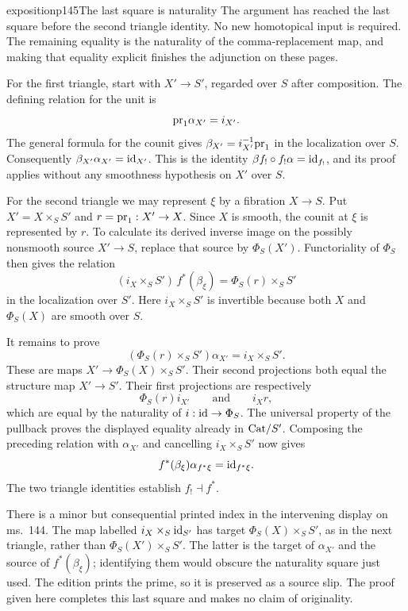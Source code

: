 \begin{dcomment}{exposition}{p145}{The last square is naturality}
The argument has reached the last square before the second triangle identity. No new homotopical input is required. The remaining equality is the naturality of the comma-replacement map, and making that equality explicit finishes the adjunction on these pages.

For the first triangle, start with $X'\to S'$, regarded over $S$ after composition. The defining relation for the unit is
\[
 \mathrm{pr}_1\alpha_{X'}=i_{X'}.
\]
The general formula for the counit gives $\beta_{X'}=i_{X'}^{-1}\mathrm{pr}_1$ in the localization over $S$. Consequently $\beta_{X'}\alpha_{X'}=\mathrm{id}_{X'}$. This is the identity $\beta f_!\circ f_!\alpha=\mathrm{id}_{f_!}$, and its proof applies without any smoothness hypothesis on $X'$ over $S$.

For the second triangle we may represent $\xi$ by a fibration $X\to S$. Put $X'=X\times_S S'$ and $r=\mathrm{pr}_1:X'\to X$. Since $X$ is smooth, the counit at $\xi$ is represented by $r$. To calculate its derived inverse image on the possibly nonsmooth source $X'\to S$, replace that source by $\Phi_S(X')$. Functoriality of $\Phi_S$ then gives the relation
\[
 (i_X\times_S S')\,f^*(\beta_\xi)
 =\Phi_S(r)\times_S S'
\]
in the localization over $S'$. Here $i_X\times_S S'$ is invertible because both $X$ and $\Phi_S(X)$ are smooth over $S$.

It remains to prove
\[
 (\Phi_S(r)\times_S S')\alpha_{X'}=i_X\times_S S'.
\]
These are maps $X'\to\Phi_S(X)\times_S S'$. Their second projections both equal the structure map $X'\to S'$. Their first projections are respectively
\[
 \Phi_S(r)i_{X'}\qquad\text{and}\qquad i_Xr,
\]
which are equal by the naturality of $i:\mathrm{id}\to\Phi_S$. The universal property of the pullback proves the displayed equality already in $\mathrm{Cat}/S'$. Composing the preceding relation with $\alpha_{X'}$ and cancelling $i_X\times_S S'$ now gives
\[
 f^*(\beta_\xi)\alpha_{f^*\xi}=\mathrm{id}_{f^*\xi}.
\]
The two triangle identities establish $f_!\dashv f^*$.

There is a minor but consequential printed index in the intervening display on ms.~144. The map labelled $i_X\times_S\mathrm{id}_{S'}$ has target $\Phi_S(X)\times_S S'$, as in the next triangle, rather than $\Phi_S(X')\times_S S'$. The latter is the target of $\alpha_{X'}$ and the source of $f^*(\beta_\xi)$; identifying them would obscure the naturality square just used. The edition prints the prime, so it is preserved as a source slip. The proof given here completes this last square and makes no claim of originality.
\end{dcomment}
